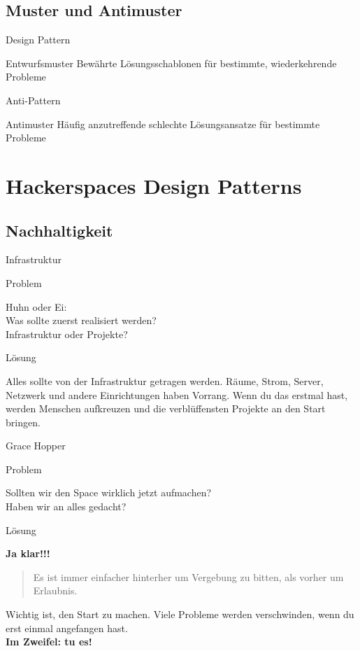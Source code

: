 \documentclass{beamer}
\newcommand{\concept}[2]{
  \begin{block}{#1}
    #2
  \end{block}
}
\newcommand{\pattern}[2]{
  \begin{alertblock}{Problem}
    #1
  \end{alertblock}
  \pause
  \begin{exampleblock}{Lösung}
    #2
  \end{exampleblock}
}
\begin{document}
  \subsection{Muster und Antimuster}

  \begin{frame}{Design Pattern}
    \concept{Entwurfsmuster}{Bewährte Lösungsschablonen für bestimmte, wiederkehrende Probleme}
  \end{frame}

  \begin{frame}{Anti-Pattern}
    \concept{Antimuster}{Häufig anzutreffende schlechte Lösungsansatze für bestimmte Probleme}
  \end{frame}

  \section{Hackerspaces Design Patterns}

  \subsection{Nachhaltigkeit}

  \begin{frame}{Infrastruktur}
    \pattern{
      Huhn oder Ei:\\
      Was sollte zuerst realisiert werden?\\
      Infrastruktur oder Projekte?
    }{
      Alles sollte von der Infrastruktur getragen werden. Räume, Strom, Server,
      Netzwerk und andere Einrichtungen haben Vorrang. Wenn du das erstmal hast,
      werden Menschen aufkreuzen und die verblüffensten Projekte an den Start
      bringen.
    }
  \end{frame}

  \begin{frame}{Grace Hopper}
    \pattern{
      Sollten wir den Space wirklich jetzt aufmachen?\\
      Haben wir an alles gedacht?
    }{
      \textbf{Ja klar!!!}
      \pause
      \begin{quote}
        Es ist immer einfacher hinterher um Vergebung zu bitten, als vorher um
        Erlaubnis.
      \end{quote}
      \pause
      Wichtig ist, den Start zu machen. Viele Probleme werden verschwinden, wenn
      du erst einmal angefangen hast.\\ \textbf{Im Zweifel: tu es!}
    }
  \end{frame}
\end{document}
